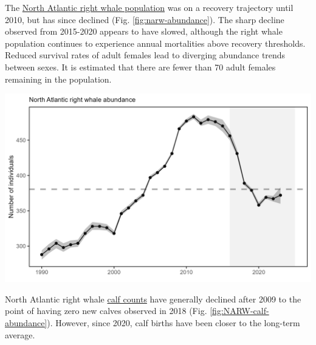 \documentclass[
  10pt,
]{article}
\let\origfigure\figure
\let\endorigfigure\endfigure
\renewenvironment{figure}[1][2] {
    \expandafter\origfigure\expandafter[H]
} {
    \endorigfigure
}
\begin{document}
The \href{https://noaa-edab.github.io/catalog/narw.html}{North Atlantic right whale population} was on a recovery trajectory until 2010, but has since declined (Fig. \ref{fig:narw-abundance}). The sharp decline observed from 2015-2020 appears to have slowed, although the right whale population continues to experience annual mortalities above recovery thresholds. Reduced survival rates of adult females lead to diverging abundance trends between sexes. It is estimated that there are fewer than 70 adult females remaining in the population.

\begin{figure}

{\centering \includegraphics[width=6.5in]{images/BothReports/narw_abundance_BothReports_2025-09-09} 

}

\caption{Estimated North Atlanic right whale abundance on the Northeast Shelf.}\label{fig:narw-abundance}
\end{figure}

North Atlantic right whale \href{https://noaa-edab.github.io/catalog/narw.html}{calf counts} have generally declined after 2009 to the point of having zero new calves observed in 2018 (Fig. \ref{fig:NARW-calf-abundance}). However, since 2020, calf births have been closer to the long-term average.
\end{document}
